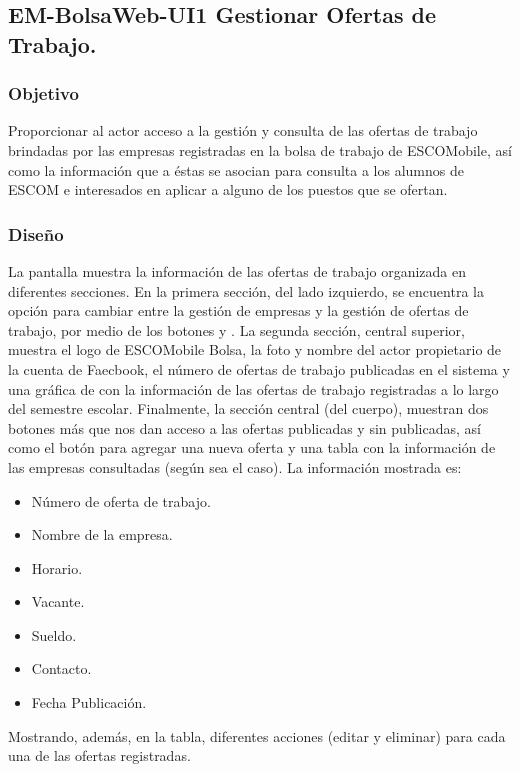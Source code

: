 
\pagebreak

\subsection{EM-BolsaWeb-UI1 Gestionar Ofertas de Trabajo.}

\subsubsection{Objetivo}
	\noindent
	Proporcionar al actor acceso a la gestión y consulta de las ofertas de trabajo brindadas por las empresas registradas en la bolsa de trabajo de ESCOMobile, así como la información que a éstas se asocian para consulta a los alumnos de ESCOM e interesados en aplicar a alguno de los puestos que se ofertan. 

\subsubsection{Diseño}
	\noindent
	La pantalla muestra la información de las ofertas de trabajo organizada en diferentes secciones. En la primera sección, del lado izquierdo, se encuentra la opción para cambiar entre la gestión de empresas y la gestión de ofertas de trabajo, por medio de los botones  y . La segunda sección, central superior, muestra el logo de ESCOMobile Bolsa,  la foto y nombre del actor propietario de la cuenta de Faecbook, el número de ofertas de trabajo publicadas en el sistema y una gráfica de con la información de las ofertas de trabajo registradas a lo largo del semestre escolar. Finalmente, la sección central (del cuerpo), muestran dos botones más que nos dan acceso a las ofertas publicadas y sin publicadas, así como el botón  para agregar una nueva oferta y una tabla con la información de las empresas consultadas (según sea el caso). La información mostrada es:
	\begin{itemize}
		\item Número de oferta de trabajo.
		\item Nombre de la empresa.
		\item Horario.
		\item Vacante.
		\item Sueldo.
		\item Contacto.
		\item Fecha Publicación.
	\end{itemize}	
	Mostrando, además, en la tabla, diferentes acciones (editar y eliminar) para cada una de las ofertas registradas.

